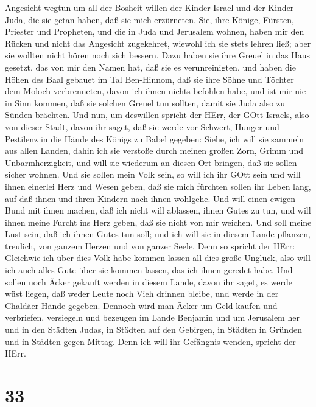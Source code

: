 Angesicht wegtun  um all der Bosheit willen der Kinder
Israel und der Kinder Juda, die sie getan haben, daß sie mich
erzürneten. Sie, ihre Könige, Fürsten, Priester und Propheten, und die
in Juda und Jerusalem wohnen,  haben mir den Rücken und
nicht das Angesicht zugekehret, wiewohl ich sie stets lehren ließ; aber
sie wollten nicht hören noch sich bessern.  Dazu haben sie
ihre Greuel in das Haus gesetzt, das von mir den Namen hat, daß sie es
verunreinigten,  und haben die Höhen des Baal gebauet im
Tal Ben-Hinnom, daß sie ihre Söhne und Töchter dem Moloch verbrenneten,
davon ich ihnen nichts befohlen habe, und ist mir nie in Sinn kommen,
daß sie solchen Greuel tun sollten, damit sie Juda also zu Sünden
brächten.  Und nun, um deswillen spricht der HErr, der GOtt
Israels, also von dieser Stadt, davon ihr saget, daß sie werde vor
Schwert, Hunger und Pestilenz in die Hände des Königs zu Babel gegeben:
 Siehe, ich will sie sammeln aus allen Landen, dahin ich
sie verstoße durch meinen großen Zorn, Grimm und Unbarmherzigkeit, und
will sie wiederum an diesen Ort bringen, daß sie sollen sicher wohnen.
 Und sie sollen mein Volk sein, so will ich ihr GOtt sein
 und will ihnen einerlei Herz und Wesen geben, daß sie mich
fürchten sollen ihr Leben lang, auf daß ihnen und ihren Kindern nach
ihnen wohlgehe.  Und will einen ewigen Bund mit ihnen
machen, daß ich nicht will ablassen, ihnen Gutes zu tun, und will ihnen
meine Furcht ins Herz geben, daß sie nicht von mir weichen.
 Und soll meine Lust sein, daß ich ihnen Gutes tun soll;
und ich will sie in diesem Lande pflanzen, treulich, von ganzem Herzen
und von ganzer Seele.  Denn so spricht der HErr: Gleichwie
ich über dies Volk habe kommen lassen all dies große Unglück, also will
ich auch alles Gute über sie kommen lassen, das ich ihnen geredet habe.
 Und sollen noch Äcker gekauft werden in diesem Lande,
davon ihr saget, es werde wüst liegen, daß weder Leute noch Vieh drinnen
bleibe, und werde in der Chaldäer Hände gegeben.  Dennoch
wird man Äcker um Geld kaufen und verbriefen, versiegeln und bezeugen im
Lande Benjamin und um Jerusalem her und in den Städten Judas, in Städten
auf den Gebirgen, in Städten in Gründen und in Städten gegen Mittag.
Denn ich will ihr Gefängnis wenden, spricht der HErr.

\hypertarget{section-32}{%
\section{33}\label{section-32}}

